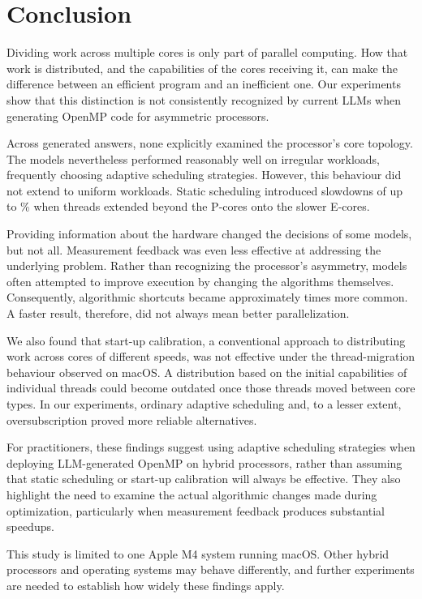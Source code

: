 \documentclass[conference]{IEEEtran}
\begin{document}
\section{Conclusion}
Dividing work across multiple cores is only part of parallel computing. How that work is distributed, and the capabilities of the cores receiving it, can make the difference between an efficient program and an inefficient one. Our experiments show that this distinction is not consistently recognized by current LLMs when generating OpenMP code for asymmetric processors.

Across \NumAllAnswers{} generated answers, none explicitly examined the processor's core topology. The models nevertheless performed reasonably well on irregular workloads, frequently choosing adaptive scheduling strategies. However, this behaviour did not extend to uniform workloads. Static scheduling introduced slowdowns of up to \NumStaticUniMax\% when threads extended beyond the P-cores onto the slower E-cores.

Providing information about the hardware changed the decisions of some models, but not all. Measurement feedback was even less effective at addressing the underlying problem. Rather than recognizing the processor's asymmetry, models often attempted to improve execution by changing the algorithms themselves. Consequently, algorithmic shortcuts became approximately \NumShortcutRatio{} times more common. A faster result, therefore, did not always mean better parallelization.

We also found that start-up calibration, a conventional approach to distributing work across cores of different speeds, was not effective under the thread-migration behaviour observed on macOS. A distribution based on the initial capabilities of individual threads could become outdated once those threads moved between core types. In our experiments, ordinary adaptive scheduling and, to a lesser extent, oversubscription proved more reliable alternatives.

For practitioners, these findings suggest using adaptive scheduling strategies when deploying LLM-generated OpenMP on hybrid processors, rather than assuming that static scheduling or start-up calibration will always be effective. They also highlight the need to examine the actual algorithmic changes made during optimization, particularly when measurement feedback produces substantial speedups.

This study is limited to one Apple M4 system running macOS. Other hybrid processors and operating systems may behave differently, and further experiments are needed to establish how widely these findings apply.
\end{document}
